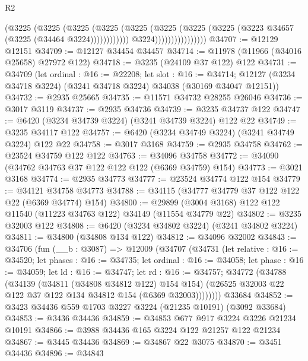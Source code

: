 \begin{lexlean}{R2}
\begin{coremodule}
                                      (@3225
                                        (@3225
                                          (@3225
                                            (@3225
                                              (@3225
                                                (@3225
                                                  (@3225
                                                    (@3225
                                                      (@3223 @34657 (@3225 (@34464 @3224))))))))))))
                                    @3224))))))))))))))))
@34707 := @12129 @12151
@34709 := @12127 @34454 @34457
@34714 := @11978 (@11966 (@34016 @25658) @27972 @122)
@34718 := @3235 (@24109 @37 @122) @122
@34731 := @34709
    (let ordinal : @16 := @22208;
    let slot : @16 := @34714;
    @12127 (@3234 @34718 @3224) (@3241 @34718 @3224) @34038 (@30169 @34047 @12151))
@34732 := @2935 @25665
@34735 := @11571 @34732 @28255 @26046
@34736 := @3017 @3119
@34737 := @2935 @34736
@34739 := @3235 @34737 @122
@34747 := @6420 (@3234 @34739 @3224) (@3241 @34739 @3224) @122 @22
@34749 := @3235 @34117 @122
@34757 := @6420 (@3234 @34749 @3224) (@3241 @34749 @3224) @122 @22
@34758 := @3017 @3168
@34759 := @2935 @34758
@34762 := @23524 @34759 @122 @122
@34763 := @34096 @34758
@34772 := @34090 (@34762 @34763 @37 @122 @122 @122 (@6369 @34759) @154)
@34773 := @3021 @3168
@34774 := @2935 @34773
@34777 := @23524 @34774 @122 @154
@34779 := @34121 @34758 @34773
@34788 := @34115 (@34777 @34779 @37 @122 @122 @22 (@6369 @34774) @154)
@34800 := @29899 (@3004 @3168) @122 @122 @11540 (@11223 @34763 @122) @34149 (@11554 @34779 @22)
@34802 := @3235 @32003 @122
@34808 := @6420 (@3234 @34802 @3224) (@3241 @34802 @3224)
@34811 := @34800 (@34808 @134 @122)
@34812 := @34096 @32002
@34843 := @34706
    (fun (__b : @3087) =>
    @12009
      (@34707
        (@34731
          (let relative : @16 := @34520;
          let phases : @16 := @34735;
          let ordinal : @16 := @34058;
          let phase : @16 := @34059;
          let ld : @16 := @34747;
          let rd : @16 := @34757;
          @34772
            (@34788
              (@34139
                (@34811 (@34808 @34812 @122) @154 @154)
                (@26525 @32003 @22 @122 @37 @122 @134 @34812 @154 (@6369 @32003))))))))
    @33684
@34852 := @3423 @34436 @559 @1703 @3227 @3224 (@21235 @10191) (@3092 @33684)
@34853 := @3436 @34436
@34859 := @34853 @677 @917 @3224 @3226 @21234 @10191
@34866 := @3988 @34436 @165 @3224 @122 @21257 @122 @21234
@34867 := @3445 @34436
@34869 := @34867 @22 @3075
@34870 := @3451 @34436
@34896 := @34843

\end{coremodule}
\end{lexlean}
